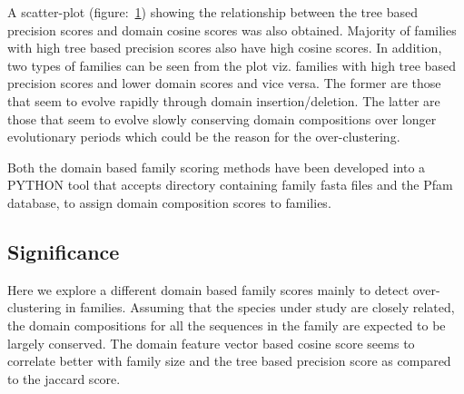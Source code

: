 \documentclass{article}
\begin{document}
		A scatter-plot (figure:~\ref{fig:scatter_domain_cosine_vs_tree_precision_lgf5}) showing the relationship between the tree based precision scores and domain cosine scores was also obtained. Majority of families with high tree based precision scores also have high cosine scores. In addition, two types of families can be seen from the plot viz. families with high tree based precision scores and lower domain scores and vice versa. The former are those that seem to evolve rapidly through domain insertion/deletion. The latter are those that seem to evolve slowly conserving domain compositions over longer evolutionary periods which could be the reason for the over-clustering.
		
		\begin{figure}
			\caption{}
			\label{fig:scatter_domain_cosine_vs_tree_precision_lgf5}
		\end{figure}
		
		Both the domain based family scoring methods have been developed into a PYTHON tool that accepts directory containing family fasta files and the Pfam database, to assign domain composition scores to families.
	
	\subsection{Significance}
	Here we explore a different domain based family scores mainly to detect over-clustering in families. Assuming that the species under study are closely related, the domain compositions for all the sequences in the family are expected to be largely conserved. The domain feature vector based cosine score seems to correlate better with family size and the tree based precision score as compared to the jaccard score.
	
\end{document}
